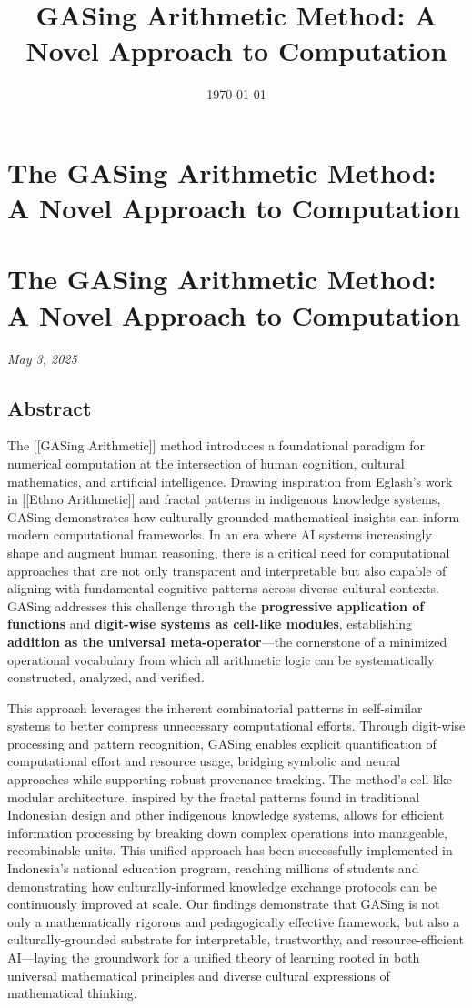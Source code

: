 \documentclass[11pt,a4paper]{article}
\title{GASing Arithmetic Method: A Novel Approach to Computation}
\author{}
\date{\today}
\begin{document}
\maketitle
\tableofcontents
\newpage
\section{The GASing Arithmetic Method: A Novel Approach to Computation}
\section{The GASing Arithmetic Method: A Novel Approach to Computation}
\emph{May 3, 2025}

\subsection{Abstract}
The [[GASing Arithmetic]] method introduces a foundational paradigm for numerical computation at the intersection of human cognition, cultural mathematics, and artificial intelligence. Drawing inspiration from Eglash's work in [[Ethno Arithmetic]] and fractal patterns in indigenous knowledge systems, GASing demonstrates how culturally-grounded mathematical insights can inform modern computational frameworks. In an era where AI systems increasingly shape and augment human reasoning, there is a critical need for computational approaches that are not only transparent and interpretable but also capable of aligning with fundamental cognitive patterns across diverse cultural contexts. GASing addresses this challenge through the \textbf{progressive application of functions} and \textbf{digit-wise systems as cell-like modules}, establishing \textbf{addition as the universal meta-operator}—the cornerstone of a minimized operational vocabulary from which all arithmetic logic can be systematically constructed, analyzed, and verified. 

This approach leverages the inherent combinatorial patterns in self-similar systems to better compress unnecessary computational efforts. Through digit-wise processing and pattern recognition, GASing enables explicit quantification of computational effort and resource usage, bridging symbolic and neural approaches while supporting robust provenance tracking. The method's cell-like modular architecture, inspired by the fractal patterns found in traditional Indonesian design and other indigenous knowledge systems, allows for efficient information processing by breaking down complex operations into manageable, recombinable units. This unified approach has been successfully implemented in Indonesia's national education program, reaching millions of students and demonstrating how culturally-informed knowledge exchange protocols can be continuously improved at scale. Our findings demonstrate that GASing is not only a mathematically rigorous and pedagogically effective framework, but also a culturally-grounded substrate for interpretable, trustworthy, and resource-efficient AI—laying the groundwork for a unified theory of learning rooted in both universal mathematical principles and diverse cultural expressions of mathematical thinking.
\end{document}
